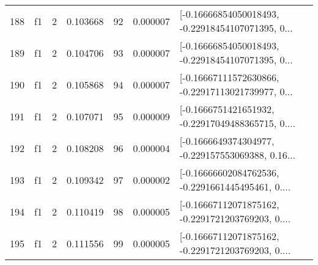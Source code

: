 \begin{tabular}{lllrlrl}
188 &  f1 &   2 &  0.103668 &   92 &  0.000007 &  [-0.16666854050018493, -0.22918454107071395, 0... \\
189 &  f1 &   2 &  0.104706 &   93 &  0.000007 &  [-0.16666854050018493, -0.22918454107071395, 0... \\
190 &  f1 &   2 &  0.105868 &   94 &  0.000007 &  [-0.16667111572630866, -0.22917113021739977, 0... \\
191 &  f1 &   2 &  0.107071 &   95 &  0.000009 &  [-0.1666751421651932, -0.22917049488365715, 0.... \\
192 &  f1 &   2 &  0.108208 &   96 &  0.000004 &  [-0.1666649374304977, -0.229157553069388, 0.16... \\
193 &  f1 &   2 &  0.109342 &   97 &  0.000002 &  [-0.16666602084762536, -0.2291661445495461, 0.... \\
194 &  f1 &   2 &  0.110419 &   98 &  0.000005 &  [-0.16667112071875162, -0.2291721203769203, 0.... \\
195 &  f1 &   2 &  0.111556 &   99 &  0.000005 &  [-0.16667112071875162, -0.2291721203769203, 0.... \\
\bottomrule
\end{tabular}
